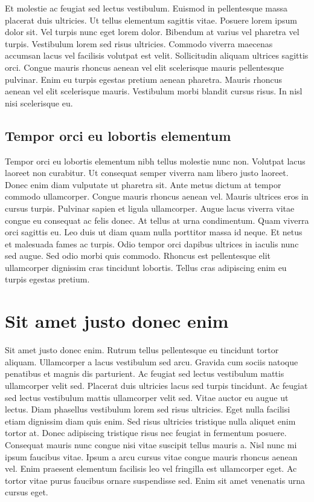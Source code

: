 Et molestie ac feugiat sed lectus vestibulum. Euismod in pellentesque massa placerat duis ultricies. Ut tellus elementum sagittis vitae. Posuere lorem ipsum dolor sit. Vel turpis nunc eget lorem dolor. Bibendum at varius vel pharetra vel turpis. Vestibulum lorem sed risus ultricies. Commodo viverra maecenas accumsan lacus vel facilisis volutpat est velit. Sollicitudin aliquam ultrices sagittis orci. Congue mauris rhoncus aenean vel elit scelerisque mauris pellentesque pulvinar. Enim eu turpis egestas pretium aenean pharetra. Mauris rhoncus aenean vel elit scelerisque mauris. Vestibulum morbi blandit cursus risus. In nisl nisi scelerisque eu.

\section{Tempor orci eu lobortis elementum}
Tempor orci eu lobortis elementum nibh tellus molestie nunc non. Volutpat lacus laoreet non curabitur. Ut consequat semper viverra nam libero justo laoreet. Donec enim diam vulputate ut pharetra sit. Ante metus dictum at tempor commodo ullamcorper. Congue mauris rhoncus aenean vel. Mauris ultrices eros in cursus turpis. Pulvinar sapien et ligula ullamcorper. Augue lacus viverra vitae congue eu consequat ac felis donec. At tellus at urna condimentum. Quam viverra orci sagittis eu. Leo duis ut diam quam nulla porttitor massa id neque. Et netus et malesuada fames ac turpis. Odio tempor orci dapibus ultrices in iaculis nunc sed augue. Sed odio morbi quis commodo. Rhoncus est pellentesque elit ullamcorper dignissim cras tincidunt lobortis. Tellus cras adipiscing enim eu turpis egestas pretium.

\chapter{Sit amet justo donec enim}
Sit amet justo donec enim. Rutrum tellus pellentesque eu tincidunt tortor aliquam. Ullamcorper a lacus vestibulum sed arcu. Gravida cum sociis natoque penatibus et magnis dis parturient. Ac feugiat sed lectus vestibulum mattis ullamcorper velit sed. Placerat duis ultricies lacus sed turpis tincidunt. Ac feugiat sed lectus vestibulum mattis ullamcorper velit sed. Vitae auctor eu augue ut lectus. Diam phasellus vestibulum lorem sed risus ultricies. Eget nulla facilisi etiam dignissim diam quis enim. Sed risus ultricies tristique nulla aliquet enim tortor at. Donec adipiscing tristique risus nec feugiat in fermentum posuere. Consequat mauris nunc congue nisi vitae suscipit tellus mauris a. Nisl nunc mi ipsum faucibus vitae. Ipsum a arcu cursus vitae congue mauris rhoncus aenean vel. Enim praesent elementum facilisis leo vel fringilla est ullamcorper eget. Ac tortor vitae purus faucibus ornare suspendisse sed. Enim sit amet venenatis urna cursus eget.


